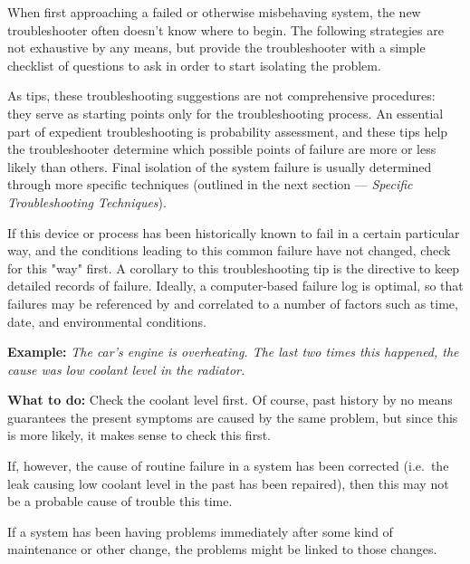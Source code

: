 \stopsection

\startsection[title={General Troubleshooting
Tips},reference={sec:xtocid15790972}]

When first approaching a failed or otherwise misbehaving system, the new
troubleshooter often doesn't know where to begin. The following
strategies are not exhaustive by any means, but provide the
troubleshooter with a simple checklist of questions to ask in order to
start isolating the problem.

As tips, these troubleshooting suggestions are not comprehensive
procedures: they serve as starting points only for the troubleshooting
process. An essential part of expedient troubleshooting is probability
assessment, and these tips help the troubleshooter determine which
possible points of failure are more or less likely than others. Final
isolation of the system failure is usually determined through more
specific techniques (outlined in the next section --- {\em Specific
Troubleshooting Techniques}).

\startsubsection[title={Prior
Occurrence},reference={sec:xtocid15790973}]

If this device or process has been historically known to fail in a
certain particular way, and the conditions leading to this common
failure have not changed, check for this "way" first. A corollary to
this troubleshooting tip is the directive to keep detailed records of
failure. Ideally, a computer-based failure log is optimal, so that
failures may be referenced by and correlated to a number of factors such
as time, date, and environmental conditions.

{\bf Example:} {\em The car's engine is overheating. The last two times
this happened, the cause was low coolant level in the radiator.}

{\bf What to do:} Check the coolant level first. Of course, past history
by no means guarantees the present symptoms are caused by the same
problem, but since this is more likely, it makes sense to check this
first.

If, however, the cause of routine failure in a system has been corrected
(i.e.~the leak causing low coolant level in the past has been repaired),
then this may not be a probable cause of trouble this time.

\stopsubsection

\startsubsection[title={Recent
Alterations},reference={sec:xtocid15790974}]

If a system has been having problems immediately after some kind of
maintenance or other change, the problems might be linked to those
changes.

